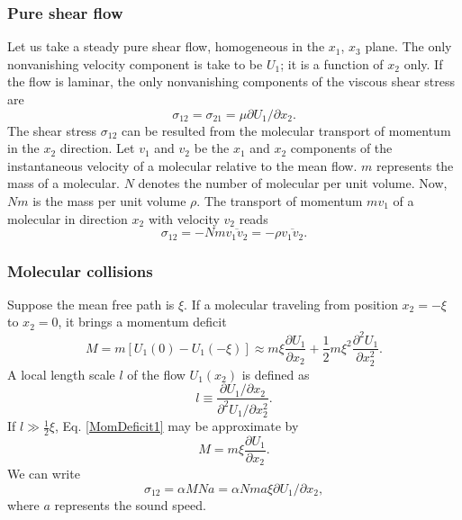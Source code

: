 \documentclass[review]{elsarticle}
\numberwithin{equation}{section}
\begin{document}
	\subsubsection{Pure shear flow}
		Let us take a steady pure shear flow, homogeneous in the $x_1$, $x_3$ plane. The only nonvanishing velocity 
		component is take to be $U_1$; it is a function of $x_2$ only. If the flow is laminar, the only nonvanishing 
		components of the viscous shear stress are 
		\begin{equation}
			\sigma_{12} = \sigma_{21} = \mu \partial U_1 / \partial x_2.
		\end{equation}
		The shear stress $\sigma_{12}$ can be resulted from the molecular transport of momentum in the $x_2$ direction.
		Let $v_1$ and $v_2$ be the $x_1$ and $x_2$ components of the instantaneous velocity of a molecular relative to 
		the mean flow. $m$ represents the mass of a molecular. $N$ denotes the number of molecular per unit volume. Now, 
		$Nm$ is the mass per unit volume $\rho$. The transport of momentum $mv_1$ of a molecular in direction $x_2$ with 
		velocity $v_2$ reads
		\begin{equation}
			\sigma_{12} = -Nm\overline{v_1v_2} = -\rho\overline{v_1v_2}.
		\end{equation}

	\subsubsection{Molecular collisions}
		Suppose the mean free path is $\xi$. If a molecular traveling from position $x_2 = -\xi$ to $x_2 = 0$, it brings 
		a momentum deficit 
		\begin{equation}\label{MomDeficit1}
			M = m[U_1(0) - U_1(-\xi)] \approx m\xi\frac{\partial U_1}{\partial x_2}+\frac{1}{2}m\xi^2\frac{\partial^2U_1}{\partial x_2^2}.
		\end{equation}  
		A local length scale $l$ of the flow $U_1(x_2)$ is defined as
		\begin{equation}\label{locallengthscale}
			l \equiv \frac{\partial U_1/\partial x_2}{\partial^2U_1/\partial x_2^2}.
		\end{equation}
		If $l \gg \frac{1}{2}\xi$, Eq. \ref{MomDeficit1} may be approximate by
		\begin{equation}
			M = m\xi\frac{\partial U_1}{\partial x_2}.
		\end{equation}
		We can write
		\begin{equation}
			\sigma_{12} = \alpha MNa = \alpha Nma\xi\partial U_1/\partial x_2,
		\end{equation}
		where $a$ represents the sound speed.
\end{document}
